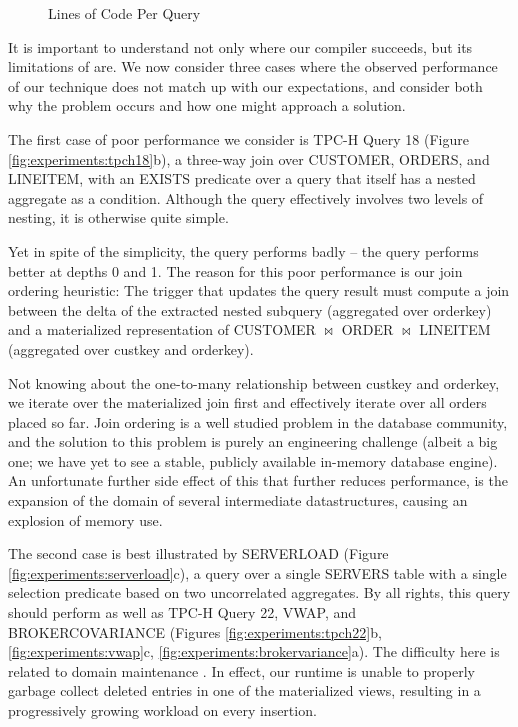 \begin{figure}
\begin{center}

\caption{Lines of Code Per Query}
\label{fig:experiments:loc}
\end{center}
\end{figure}

It is important to understand not only where our compiler succeeds, but its limitations of are.  We now consider three cases where the observed performance of our technique does not match up with our expectations, and consider both why the problem occurs and how one might approach a solution.

The first case of poor performance we consider is TPC-H Query 18 (Figure \ref{fig:experiments:tpch18}b), a three-way join over CUSTOMER, ORDERS, and LINEITEM, with an EXISTS predicate over a query that itself has a nested aggregate as a condition.  Although the query effectively involves two levels of nesting, it is otherwise quite simple.

Yet in spite of the simplicity, the query performs badly -- the query performs better at depths 0 and 1.  The reason for this poor performance is our join ordering heuristic: The trigger that updates the query result must compute a join between the delta of the extracted nested subquery (aggregated over orderkey) and a materialized representation of CUSTOMER $\bowtie$ ORDER $\bowtie$ LINEITEM (aggregated over custkey and orderkey).  

Not knowing about the one-to-many relationship between custkey and orderkey, we iterate over the materialized join first and effectively iterate over all orders placed so far.  Join ordering is a well studied problem in the database community, and the solution to this problem is purely an engineering challenge (albeit a big one; we have yet to see a stable, publicly available in-memory database engine).  An unfortunate further side effect of this that further reduces performance, is the expansion of the domain of several intermediate datastructures, causing an explosion of memory use.

The second case is best illustrated by SERVERLOAD (Figure \ref{fig:experiments:serverload}c), a query over a single SERVERS table with a single selection predicate based on two uncorrelated aggregates.  By all rights, this query should perform as well as TPC-H Query 22, VWAP, and BROKERCOVARIANCE (Figures \ref{fig:experiments:tpch22}b, \ref{fig:experiments:vwap}c, \ref{fig:experiments:brokervariance}a).  The difficulty here is related to domain maintenance .  In effect, our runtime is unable to properly garbage collect deleted entries in one of the materialized views, resulting in a progressively growing workload on every insertion.  

